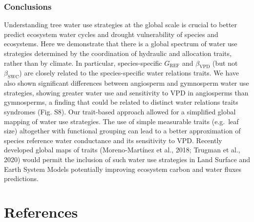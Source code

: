 \documentclass[11pt,twoside]{reedthesis}
\begin{document}
\subsection{Conclusions}\label{conclusions}

Understanding tree water use strategies at the global scale is crucial
to better predict ecosystem water cycles and drought vulnerability of
species and ecosystems. Here we demonstrate that there is a global
spectrum of water use strategies determined by the coordination of
hydraulic and allocation traits, rather than by climate. In particular,
species-specific \(G_{\text{REF}}\) and \(\beta_{\text{VPD}}\) (but not
\(\beta_{\text{SWC}}\)) are closely related to the species-specific
water relations traits. We have also shown significant differences
between angiosperm and gymnosperm water use strategies, showing greater
water use and sensitivity to VPD in angiosperms than gymnosperms, a
finding that could be related to distinct water relations traits
syndromes (Fig. S8). Our trait-based approach allowed for a simplified
global mapping of water use strategies. The use of simple measurable
traits (e.g.~leaf size) altogether with functional grouping can lead to
a better approximation of species reference water conductance and its
sensitivity to VPD. Recently developed global maps of traits
(Moreno-Martínez et al., 2018; Trugman et al., 2020) would permit the
inclusion of such water use strategies in Land Surface and Earth System
Models potentially improving ecosystem carbon and water fluxes
predictions.\par

\chapter*{References}\label{references}

\setlength{\parindent}{-0.20in} \setlength{\leftskip}{0.20in}
\setlength{\parskip}{8pt}
\end{document}
